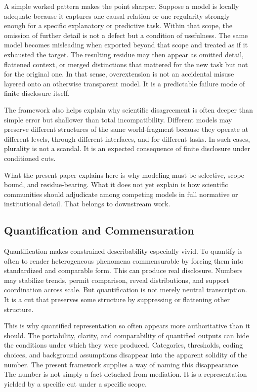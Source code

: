 \documentclass[11pt]{article}
\begin{document}
A simple worked pattern makes the point sharper. Suppose a model is locally adequate because it captures one causal relation or one regularity strongly enough for a specific explanatory or predictive task. Within that scope, the omission of further detail is not a defect but a condition of usefulness. The same model becomes misleading when exported beyond that scope and treated as if it exhausted the target. The resulting residue may then appear as omitted detail, flattened context, or merged distinctions that mattered for the new task but not for the original one. In that sense, overextension is not an accidental misuse layered onto an otherwise transparent model. It is a predictable failure mode of finite disclosure itself. \cite{frigg_hartmann_models_sep,frigg_nguyen_scientific_representation_sep}

The framework also helps explain why scientific disagreement is often deeper than simple error but shallower than total incompatibility. Different models may preserve different structures of the same world-fragment because they operate at different levels, through different interfaces, and for different tasks. In such cases, plurality is not a scandal. It is an expected consequence of finite disclosure under conditioned cuts. \cite{scientific_pluralism_sep,levels_org_biology_sep}

What the present paper explains here is why modeling must be selective, scope-bound, and residue-bearing. What it does not yet explain is how scientific communities should adjudicate among competing models in full normative or institutional detail. That belongs to downstream work.

\subsection{Quantification and Commensuration}

Quantification makes constrained describability especially vivid. To quantify is often to render heterogeneous phenomena commensurable by forcing them into standardized and comparable form. This can produce real disclosure. Numbers may stabilize trends, permit comparison, reveal distributions, and support coordination across scale. But quantification is not merely neutral transcription. It is a cut that preserves some structure by suppressing or flattening other structure. \cite{espeland_stevens_quantification,merry_seductions_of_quantification,porter_trust_in_numbers}

This is why quantified representation so often appears more authoritative than it should. The portability, clarity, and comparability of quantified outputs can hide the conditions under which they were produced. Categories, thresholds, coding choices, and background assumptions disappear into the apparent solidity of the number. The present framework supplies a way of naming this disappearance. The number is not simply a fact detached from mediation. It is a representation yielded by a specific cut under a specific scope. \cite{espeland_stevens_quantification,porter_trust_in_numbers}
\end{document}
